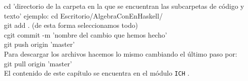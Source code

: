 cd 'directorio de la carpeta en la que se encuentran las subcarpetas de código y texto' ejemplo: cd Escritorio/AlgebraConEnHaskell/  \\

git add .  (de esta forma seleccionamos todo)\\

cgit commit -m 'nombre del cambio que hemos hecho'\\

git push origin 'master'\\


Para descargar los archivos hacemos lo mismo cambiando el último paso por:\\

git pull origin 'master'\\




El contenido de este capítulo se encuentra en el módulo \texttt{ICH} 
.

